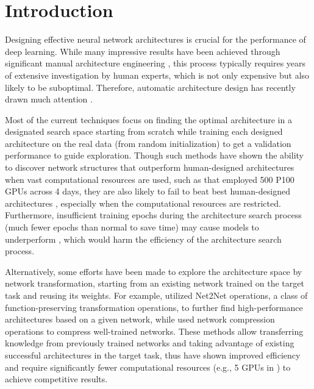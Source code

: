 \documentclass{article}
\begin{document}
\section{Introduction}
Designing effective neural network architectures is crucial for the performance of deep learning. While many impressive results have been achieved through significant manual architecture engineering \cite{simonyan2014very,szegedy2015going,he2016deep,huang2016densely}, this process typically requires years of extensive investigation by human experts, which is not only expensive but also likely to be suboptimal. Therefore, automatic architecture design has recently drawn much attention \cite{zoph2016neural,zoph2017learning,liu2017progressive,cai2018efficient,real2018regularized,pham2018efficient}. 

Most of the current techniques focus on finding the optimal architecture in a designated search space starting from scratch while training each designed architecture on the real data (from random initialization) to get a validation performance to guide exploration. Though such methods have shown the ability to discover network structures that outperform human-designed architectures when vast computational resources are used, such as \citet{zoph2017learning} that employed 500 P100 GPUs across 4 days, they are also likely to fail to beat best human-designed architectures \cite{zoph2016neural,real2017large,liu2017hierarchical}, especially when the computational resources are restricted. Furthermore, insufficient training epochs during the architecture search process (much fewer epochs than normal to save time) may cause models to underperform \cite{baker2016designing}, which would harm the efficiency of the architecture search process. 

Alternatively, some efforts have been made to explore the architecture space by network transformation, starting from an existing network trained on the target task and reusing its weights. For example, \citet{cai2018efficient} utilized Net2Net \cite{chen2015net2net} operations, a class of function-preserving transformation operations, to further find high-performance architectures based on a given network, while \citet{ashok2017n2n} used network compression operations to compress well-trained networks. These methods allow transferring knowledge from previously trained networks and taking advantage of existing successful architectures in the target task, thus have shown improved efficiency and require significantly fewer computational resources (e.g., 5 GPUs in \citet{cai2018efficient}) to achieve competitive results. 
\end{document}
